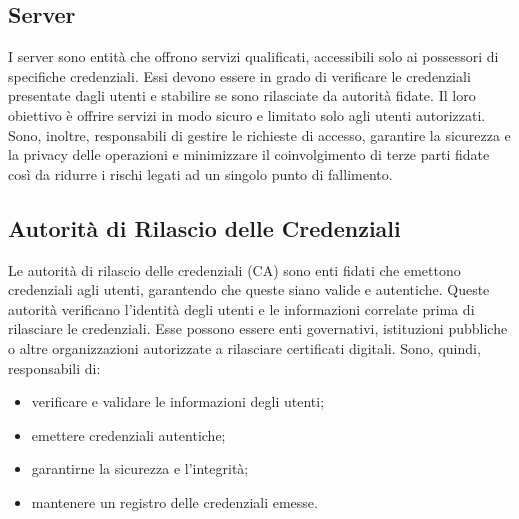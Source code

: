         \subsection{Server}
            I server sono entità che offrono servizi qualificati, accessibili solo ai possessori di specifiche credenziali.
            Essi devono essere in grado di verificare le credenziali presentate dagli utenti e stabilire se sono rilasciate da autorità fidate.
            Il loro obiettivo è offrire servizi in modo sicuro e limitato solo agli utenti autorizzati.
            Sono, inoltre, responsabili di gestire le richieste di accesso, garantire la sicurezza e la privacy delle operazioni e minimizzare il coinvolgimento di terze parti fidate così da ridurre i rischi legati ad un singolo punto di fallimento.
            
        \subsection{Autorità di Rilascio delle Credenziali}
            Le autorità di rilascio delle credenziali (CA) sono enti fidati che emettono credenziali agli utenti, garantendo che queste siano valide e autentiche.
            Queste autorità verificano l'identità degli utenti e le informazioni correlate prima di rilasciare le credenziali.
            Esse possono essere enti governativi, istituzioni pubbliche o altre organizzazioni autorizzate a rilasciare certificati digitali.
            Sono, quindi, responsabili di:
                \begin{itemize}
                    \item verificare e validare le informazioni degli utenti;
    
                    \item emettere credenziali autentiche;
    
                    \item garantirne la sicurezza e l'integrità;
    
                    \item mantenere un registro delle credenziali emesse.
                \end{itemize}
    

